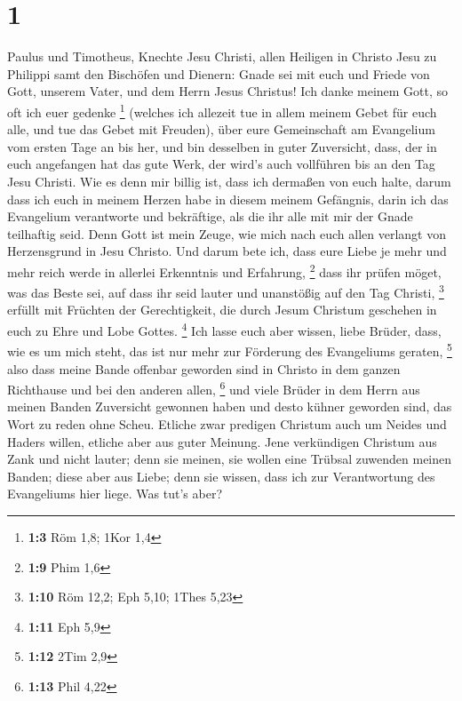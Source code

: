 \hypertarget{section}{%
\section{1}\label{section}}

 Paulus und Timotheus, Knechte Jesu Christi, allen Heiligen
in Christo Jesu zu Philippi samt den Bischöfen und Dienern: 
Gnade sei mit euch und Friede von Gott, unserem Vater, und dem Herrn
Jesus Christus!  Ich danke meinem Gott, so oft ich euer
gedenke \footnote{\textbf{1:3} Röm 1,8; 1Kor 1,4}  (welches
ich allezeit tue in allem meinem Gebet für euch alle, und tue das Gebet
mit Freuden),  über eure Gemeinschaft am Evangelium vom
ersten Tage an bis her,  und bin desselben in guter
Zuversicht, dass, der in euch angefangen hat das gute Werk, der wird's
auch vollführen bis an den Tag Jesu Christi.  Wie es denn
mir billig ist, dass ich dermaßen von euch halte, darum dass ich euch in
meinem Herzen habe in diesem meinem Gefängnis, darin ich das Evangelium
verantworte und bekräftige, als die ihr alle mit mir der Gnade
teilhaftig seid.  Denn Gott ist mein Zeuge, wie mich nach
euch allen verlangt von Herzensgrund in Jesu Christo.  Und
darum bete ich, dass eure Liebe je mehr und mehr reich werde in allerlei
Erkenntnis und Erfahrung, \footnote{\textbf{1:9} Phim 1,6} 
dass ihr prüfen möget, was das Beste sei, auf dass ihr seid lauter und
unanstößig auf den Tag Christi, \footnote{\textbf{1:10} Röm 12,2; Eph
  5,10; 1Thes 5,23}  erfüllt mit Früchten der
Gerechtigkeit, die durch Jesum Christum geschehen in euch zu Ehre und
Lobe Gottes. \footnote{\textbf{1:11} Eph 5,9}  Ich lasse
euch aber wissen, liebe Brüder, dass, wie es um mich steht, das ist nur
mehr zur Förderung des Evangeliums geraten, \footnote{\textbf{1:12} 2Tim
  2,9}  also dass meine Bande offenbar geworden sind in
Christo in dem ganzen Richthause und bei den anderen allen, \footnote{\textbf{1:13}
  Phil 4,22}  und viele Brüder in dem Herrn aus meinen
Banden Zuversicht gewonnen haben und desto kühner geworden sind, das
Wort zu reden ohne Scheu.  Etliche zwar predigen Christum
auch um Neides und Haders willen, etliche aber aus guter Meinung.
 Jene verkündigen Christum aus Zank und nicht lauter; denn
sie meinen, sie wollen eine Trübsal zuwenden meinen Banden;
 diese aber aus Liebe; denn sie wissen, dass ich zur
Verantwortung des Evangeliums hier liege.  Was tut's aber?
